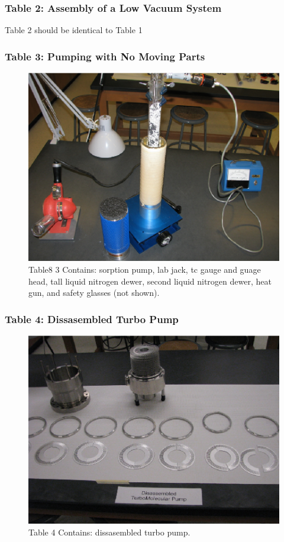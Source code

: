 \documentclass{book}
\begin{document}
\subsubsection{Table 2: Assembly of a Low Vacuum System}
Table 2 should be identical to Table 1

\subsubsection{Table 3: Pumping with No Moving Parts}

\begin{figure}[H]
\includegraphics[scale=0.8]{Sorption-Pump-Table3}
\caption[align=left]{Table8 3 Contains: sorption pump, lab jack, tc gauge and guage head, tall liquid nitrogen dewer, second liquid nitrogen dewer, heat gun, and safety glasses (not shown).}
\end{figure}

\subsubsection{Table 4: Dissasembled Turbo Pump}

\begin{figure}[H]
\includegraphics[scale=0.8]{Turbo-Pump-Table4}
\caption[align=left]{Table 4 Contains: dissasembled turbo pump.}
\end{figure}
\end{document}

